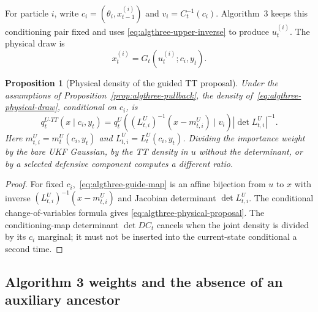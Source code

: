 \documentclass[11pt]{article}
\newtheorem{proposition}{Proposition}
\begin{document}
For particle $i$, write $c_i=(\theta_i,x_{t-1}^{(i)})$ and
$v_i=C_t^{-1}(c_i)$.  Algorithm~3 keeps this conditioning pair fixed and uses
\eqref{eq:algthree-upper-inverse} to produce $u_t^{(i)}$.  The physical draw is
\begin{equation}
 x_t^{(i)}=G_t(u_t^{(i)};c_i,y_t).
 \label{eq:algthree-physical-draw}
\end{equation}

\begin{proposition}[Physical density of the guided TT proposal]
\label{prop:algthree-physical-density}
Under the assumptions of Proposition~\ref{prop:algthree-pullback}, the density
of~\eqref{eq:algthree-physical-draw}, conditional on $c_i$, is
\begin{equation}
 q_t^{U\text{-}TT}(x\mid c_i,y_t)
 =q_t^U\!\left((L_{t,i}^U)^{-1}(x-m_{t,i}^U)\mid v_i\right)
  \left|\det L_{t,i}^U\right|^{-1}.
 \label{eq:algthree-physical-proposal}
\end{equation}
Here $m_{t,i}^U=m_t^U(c_i,y_t)$ and
$L_{t,i}^U=L_t^U(c_i,y_t)$.  Dividing the importance weight by the bare UKF
Gaussian, by the TT density in $u$ without the determinant, or by a selected
defensive component computes a different ratio.
\end{proposition}

\begin{proof}
For fixed $c_i$,~\eqref{eq:algthree-guide-map} is an affine bijection from $u$
to $x$ with inverse $(L_{t,i}^U)^{-1}(x-m_{t,i}^U)$ and Jacobian determinant
$\det L_{t,i}^U$.  The conditional change-of-variables formula gives
\eqref{eq:algthree-physical-proposal}.  The conditioning-map determinant
$\det DC_t$ cancels when the joint density is divided by its $c_i$ marginal;
it must not be inserted into the current-state conditional a second time.
\end{proof}

\subsection{Algorithm 3 weights and the absence of an auxiliary ancestor}
\end{document}
